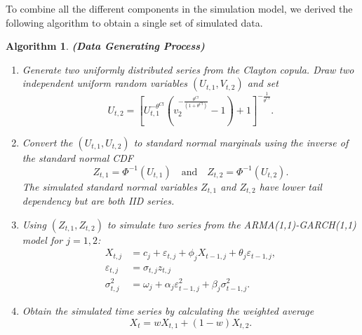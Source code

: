 \documentclass[a4paper,12pt]{article}
\theoremstyle{plain}
\begin{document}
To combine all the different components in the simulation model, we derived the following algorithm to obtain a single set of simulated data.

\newtheorem{myalgo}{Algorithm}
\begin{myalgo}{\textbf{(Data Generating Process)}}
    \quad
    \begin{enumerate}
        \item Generate two uniformly distributed series from the Clayton copula. Draw two independent uniform random variables $\left(U_{t,1},V_{t,2}\right)$ and set
            \begin{equation}                U_{t,2}=\left[U_{t,1}^{-\theta^{Cl}}\left(v_{2}^{-\frac{\theta^{Cl}}{\left(1+\theta^{Cl}\right)}}-1\right)+1\right]^{-\frac{1}{\theta^{Cl}}}.
            \end{equation}
        \item Convert the $\left(U_{t,1},U_{t,2}\right)$ to standard normal marginals using the inverse of the standard normal CDF
        \begin{equation}
            Z_{t,1} = \Phi^{-1}(U_{t,1}) \quad \text{and} \quad Z_{t,2} = \Phi^{-1}(U_{t,2}).
        \end{equation}
        The simulated standard normal variables $Z_{t,1}$ and $Z_{t,2}$ have lower tail dependency but are both IID series.
        \item Using $\left(Z_{t,1},Z_{t,2}\right)$ to simulate two series from the ARMA(1,1)-GARCH(1,1) model for $j=1,2$:
        \begin{equation}
            \begin{split}
                X_{t,j} &= c_{j} + \varepsilon_{t,j} + \phi_{j}X_{t-1,j} + \theta_{j}\varepsilon_{t-1,j},\\ \varepsilon_{t,j} &= \sigma_{t,j}z_{t,j}\\
                \sigma^2_{t,j} &= \omega_j + \alpha_{j}\varepsilon_{t-1,j}^2 + \beta_{j}\sigma_{t-1,j}^2.
            \end{split}
            \label{eq:simarmagarchdef}
        \end{equation}
        \item Obtain the simulated time series by calculating the weighted average
        \begin{equation}
            X_t = wX_{t,1} + \left(1-w\right)X_{t,2}.
        \end{equation}
    \end{enumerate}
\end{myalgo}
\end{document}
